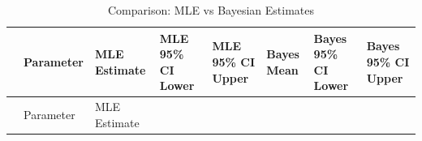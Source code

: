 \documentclass[
  letterpaper,
  DIV=11,
  numbers=noendperiod]{scrartcl}
\begin{document}
\begin{longtable}[]{@{}
  >{\raggedright\arraybackslash}p{}
  >{\raggedright\arraybackslash}p{}
  >{\raggedleft\arraybackslash}p{}
  >{\raggedleft\arraybackslash}p{}
  >{\raggedleft\arraybackslash}p{}
  >{\raggedleft\arraybackslash}p{}
  >{\raggedleft\arraybackslash}p{}
  >{\raggedleft\arraybackslash}p{}@{}}
\caption{Comparison: MLE vs Bayesian Estimates}\tabularnewline
\toprule\noalign{}
\begin{minipage}[b]{\linewidth}\raggedright
\end{minipage} & \begin{minipage}[b]{\linewidth}\raggedright
Parameter
\end{minipage} & \begin{minipage}[b]{\linewidth}\raggedleft
MLE Estimate
\end{minipage} & \begin{minipage}[b]{\linewidth}\raggedleft
MLE 95\% CI Lower
\end{minipage} & \begin{minipage}[b]{\linewidth}\raggedleft
MLE 95\% CI Upper
\end{minipage} & \begin{minipage}[b]{\linewidth}\raggedleft
Bayes Mean
\end{minipage} & \begin{minipage}[b]{\linewidth}\raggedleft
Bayes 95\% CI Lower
\end{minipage} & \begin{minipage}[b]{\linewidth}\raggedleft
Bayes 95\% CI Upper
\end{minipage} \\
\midrule\noalign{}
\endfirsthead
\toprule\noalign{}
\begin{minipage}[b]{\linewidth}\raggedright
\end{minipage} & \begin{minipage}[b]{\linewidth}\raggedright
Parameter
\end{minipage} & \begin{minipage}[b]{\linewidth}\raggedleft
MLE Estimate
\end{minipage} & \begin{minipage}[b]{\linewidth}\raggedleft

\end{minipage}
\end{longtable}
\end{document}
